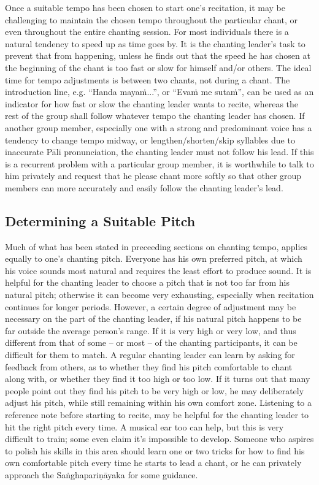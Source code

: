   Once a suitable tempo has been chosen to start one's recitation, it may be challenging to maintain the chosen tempo throughout the particular chant, or even throughout the entire chanting session. For most individuals there is a natural tendency to speed up as time goes by. It is the chanting leader's task to prevent that from happening, unless he finds out that the speed he has chosen at the beginning of the chant is too fast or slow for himself and/or others. The ideal time for tempo adjustments is between two chants, not during a chant. The introduction line, e.g. ``Handa mayaṁ...'', or ``Evaṁ me sutaṁ'', can be used as an indicator for how fast or slow the chanting leader wants to recite, whereas the rest of the group shall follow whatever tempo the chanting leader has chosen. If another group member, especially one with a strong and predominant voice has a tendency to change tempo midway, or lengthen/shorten/skip syllables due to inaccurate Pāli pronunciation, the chanting leader must not follow his lead. If this is a recurrent problem with a particular group member, it is worthwhile to talk to him privately and request that he please chant more softly so that other group members can more accurately and easily follow the chanting leader's lead.

\subsection*{Determining a Suitable Pitch}

  Much of what has been stated in preceeding sections on chanting tempo, applies equally to one's chanting pitch. Everyone has his own preferred pitch, at which his voice sounds most natural and requires the least effort to produce sound. It is helpful for the chanting leader to choose a pitch that is not too far from his natural pitch; otherwise it can become very exhausting, especially when recitation continues for longer periods. However, a certain degree of adjustment may be necessary on the part of the chanting leader, if his natural pitch happens to be far outside the average person's range. If it is very high or very low, and thus different from that of some -- or most -- of the chanting participants, it can be difficult for them to match. A regular chanting leader can learn by asking for feedback from others, as to whether they find his pitch comfortable to chant along with, or whether they find it too high or too low. If it turns out that many people point out they find his pitch to be very high or low, he may deliberately adjust his pitch, while still remaining within his own comfort zone. Listening to a reference note before starting to recite, may be helpful for the chanting leader to hit the right pitch every time. A musical ear too can help, but this is very difficult to train; some even claim it's impossible to develop. Someone who aspires to polish his skills in this area should learn one or two tricks for how to find his own comfortable pitch every time he starts to lead a chant, or he can privately approach the Saṅghapariṇāyaka for some guidance.

